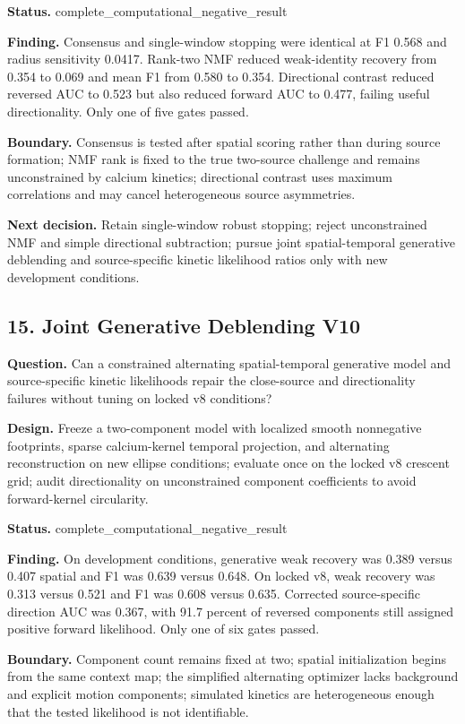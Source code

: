 \textbf{Status.} complete\_computational\_negative\_result

\textbf{Finding.} Consensus and single-window stopping were identical at F1 0.568 and radius sensitivity 0.0417. Rank-two NMF reduced weak-identity recovery from 0.354 to 0.069 and mean F1 from 0.580 to 0.354. Directional contrast reduced reversed AUC to 0.523 but also reduced forward AUC to 0.477, failing useful directionality. Only one of five gates passed.

\textbf{Boundary.} Consensus is tested after spatial scoring rather than during source formation; NMF rank is fixed to the true two-source challenge and remains unconstrained by calcium kinetics; directional contrast uses maximum correlations and may cancel heterogeneous source asymmetries.

\textbf{Next decision.} Retain single-window robust stopping; reject unconstrained NMF and simple directional subtraction; pursue joint spatial-temporal generative deblending and source-specific kinetic likelihood ratios only with new development conditions.

\subsection{15. Joint Generative Deblending V10}

\textbf{Question.} Can a constrained alternating spatial-temporal generative model and source-specific kinetic likelihoods repair the close-source and directionality failures without tuning on locked v8 conditions?

\textbf{Design.} Freeze a two-component model with localized smooth nonnegative footprints, sparse calcium-kernel temporal projection, and alternating reconstruction on new ellipse conditions; evaluate once on the locked v8 crescent grid; audit directionality on unconstrained component coefficients to avoid forward-kernel circularity.

\textbf{Status.} complete\_computational\_negative\_result

\textbf{Finding.} On development conditions, generative weak recovery was 0.389 versus 0.407 spatial and F1 was 0.639 versus 0.648. On locked v8, weak recovery was 0.313 versus 0.521 and F1 was 0.608 versus 0.635. Corrected source-specific direction AUC was 0.367, with 91.7 percent of reversed components still assigned positive forward likelihood. Only one of six gates passed.

\textbf{Boundary.} Component count remains fixed at two; spatial initialization begins from the same context map; the simplified alternating optimizer lacks background and explicit motion components; simulated kinetics are heterogeneous enough that the tested likelihood is not identifiable.

